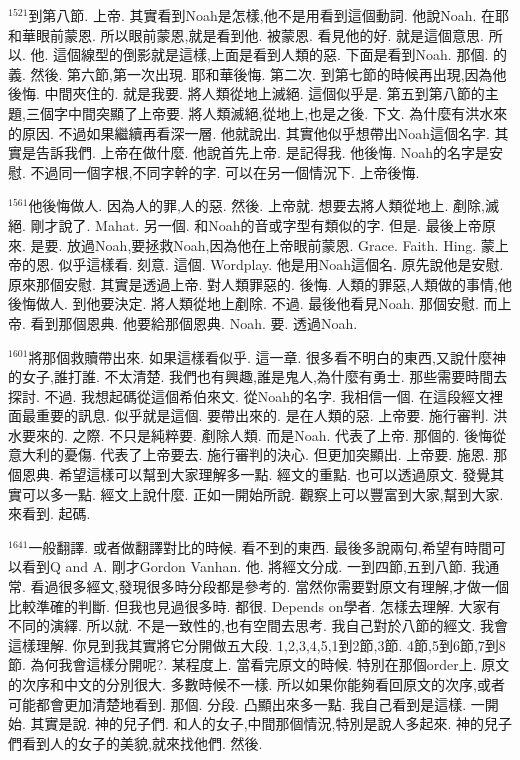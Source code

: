 \documentclass{book}
\begin{document}
$^{1521}$到第八節.
上帝.
其實看到Noah是怎樣,他不是用看到這個動詞.
他說Noah.
在耶和華眼前蒙恩.
所以眼前蒙恩,就是看到他.
被蒙恩.
看見他的好.
就是這個意思.
所以.
他.
這個線型的倒影就是這樣,上面是看到人類的惡.
下面是看到Noah.
那個.
的義.
然後.
第六節,第一次出現.
耶和華後悔.
第二次.
到第七節的時候再出現,因為他後悔.
中間夾住的.
就是我要.
將人類從地上滅絕.
這個似乎是.
第五到第八節的主題,三個字中間突顯了上帝要.
將人類滅絕,從地上,也是之後.
下文.
為什麼有洪水來的原因.
不過如果繼續再看深一層.
他就說出.
其實他似乎想帶出Noah這個名字.
其實是告訴我們.
上帝在做什麼.
他說首先上帝.
是記得我.
他後悔.
Noah的名字是安慰.
不過同一個字根,不同字幹的字.
可以在另一個情況下.
上帝後悔.

$^{1561}$他後悔做人.
因為人的罪,人的惡.
然後.
上帝就.
想要去將人類從地上.
剷除,滅絕.
剛才說了.
Mahat.
另一個.
和Noah的音或字型有類似的字.
但是.
最後上帝原來.
是要.
放過Noah,要拯救Noah,因為他在上帝眼前蒙恩.
Grace.
Faith.
Hing.
蒙上帝的恩.
似乎這樣看.
刻意.
這個.
Wordplay.
他是用Noah這個名.
原先說他是安慰.
原來那個安慰.
其實是透過上帝.
對人類罪惡的.
後悔.
人類的罪惡,人類做的事情,他後悔做人.
到他要決定.
將人類從地上剷除.
不過.
最後他看見Noah.
那個安慰.
而上帝.
看到那個恩典.
他要給那個恩典.
Noah.
要.
透過Noah.

$^{1601}$將那個救贖帶出來.
如果這樣看似乎.
這一章.
很多看不明白的東西,又說什麼神的女子,誰打誰.
不太清楚.
我們也有興趣,誰是鬼人,為什麼有勇士.
那些需要時間去探討.
不過.
我想起碼從這個希伯來文.
從Noah的名字.
我相信一個.
在這段經文裡面最重要的訊息.
似乎就是這個.
要帶出來的.
是在人類的惡.
上帝要.
施行審判.
洪水要來的.
之際.
不只是純粹要.
剷除人類.
而是Noah.
代表了上帝.
那個的.
後悔從意大利的憂傷.
代表了上帝要去.
施行審判的決心.
但更加突顯出.
上帝要.
施恩.
那個恩典.
希望這樣可以幫到大家理解多一點.
經文的重點.
也可以透過原文.
發覺其實可以多一點.
經文上說什麼.
正如一開始所說.
觀察上可以豐富到大家,幫到大家.
來看到.
起碼.

$^{1641}$一般翻譯.
或者做翻譯對比的時候.
看不到的東西.
最後多說兩句,希望有時間可以看到Q and A.
剛才Gordon Vanhan.
他.
將經文分成.
一到四節,五到八節.
我通常.
看過很多經文,發現很多時分段都是參考的.
當然你需要對原文有理解,才做一個比較準確的判斷.
但我也見過很多時.
都很.
Depends on學者.
怎樣去理解.
大家有不同的演繹.
所以就.
不是一致性的,也有空間去思考.
我自己對於八節的經文.
我會這樣理解.
你見到我其實將它分開做五大段.
1,2,3,4,5,1到2節,3節.
4節,5到6節,7到8節.
為何我會這樣分開呢?.
某程度上.
當看完原文的時候.
特別在那個order上.
原文的次序和中文的分別很大.
多數時候不一樣.
所以如果你能夠看回原文的次序,或者可能都會更加清楚地看到.
那個.
分段.
凸顯出來多一點.
我自己看到是這樣.
一開始.
其實是說.
神的兒子們.
和人的女子,中間那個情況,特別是說人多起來.
神的兒子們看到人的女子的美貌,就來找他們.
然後.
\end{document}
